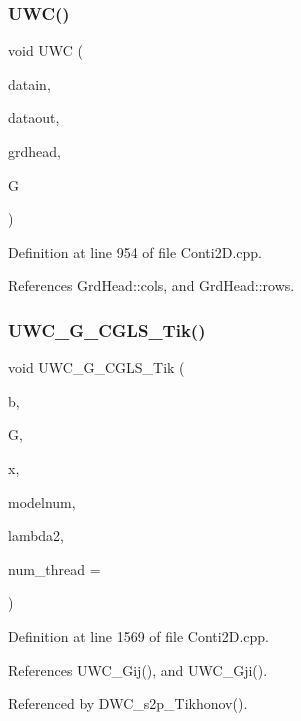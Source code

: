 \subsubsection{U\+W\+C()}
{\footnotesize\ttfamily void U\+WC (\begin{DoxyParamCaption}\item[{double $\ast$}]{datain,  }\item[{double $\ast$}]{dataout,  }\item[{\textbf{ Grd\+Head}}]{grdhead,  }\item[{double $\ast$$\ast$}]{G }\end{DoxyParamCaption})}



Definition at line 954 of file Conti2\+D.\+cpp.



References Grd\+Head\+::cols, and Grd\+Head\+::rows.

\mbox{\label{Conti2D_8h_a4a8eda8a2eef4509306c37faad796c2f_a4a8eda8a2eef4509306c37faad796c2f}} 
\subsubsection{U\+W\+C\+\_\+\+G\+\_\+\+C\+G\+L\+S\+\_\+\+Tik()}
{\footnotesize\ttfamily void U\+W\+C\+\_\+\+G\+\_\+\+C\+G\+L\+S\+\_\+\+Tik (\begin{DoxyParamCaption}\item[{double $\ast$}]{b,  }\item[{double $\ast$$\ast$}]{G,  }\item[{double $\ast$}]{x,  }\item[{int}]{modelnum,  }\item[{double}]{lambda2,  }\item[{int}]{num\+\_\+thread = {} }\end{DoxyParamCaption})}



Definition at line 1569 of file Conti2\+D.\+cpp.



References U\+W\+C\+\_\+\+Gij(), and U\+W\+C\+\_\+\+Gji().



Referenced by D\+W\+C\+\_\+s2p\+\_\+\+Tikhonov().

